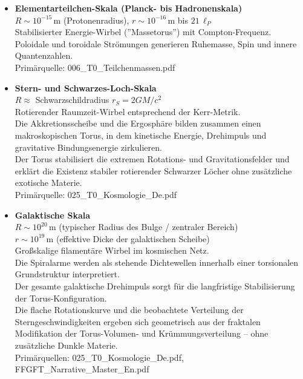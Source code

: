 \documentclass[12pt,a4paper]{article}
\begin{document}
	\begin{itemize}
		\item \textbf{Elementarteilchen-Skala (Planck- bis Hadronenskala)} \\
		$R \sim 10^{-15}\,\text{m}$ (Protonenradius), $r \sim 10^{-16}\,\text{m}$ bis $21\,\ell_P$ \\
		Stabilisierter Energie-Wirbel (''Massetorus'') mit Compton-Frequenz. \\
		Poloidale und toroidale Strömungen generieren Ruhemasse, Spin und innere Quantenzahlen. \\
		Primärquelle: 006\_T0\_Teilchenmassen.pdf
		
		\item \textbf{Stern- und Schwarzes-Loch-Skala} \\
		$R \approx$ Schwarzschildradius $r_S = 2GM/c^2$ \\
		Rotierender Raumzeit-Wirbel entsprechend der Kerr-Metrik. \\
		Die Akkretionsscheibe und die Ergosphäre bilden zusammen einen makroskopischen Torus, in dem kinetische Energie, Drehimpuls und gravitative Bindungsenergie zirkulieren. \\
		Der Torus stabilisiert die extremen Rotations- und Gravitationsfelder und erklärt die Existenz stabiler rotierender Schwarzer Löcher ohne zusätzliche exotische Materie. \\
		Primärquelle: 025\_T0\_Kosmologie\_De.pdf
		
		\item \textbf{Galaktische Skala} \\
		$R \sim 10^{20}\,\text{m}$ (typischer Radius des Bulge / zentraler Bereich) \\
		$r \sim 10^{19}\,\text{m}$ (effektive Dicke der galaktischen Scheibe) \\
		Großskalige filamentäre Wirbel im kosmischen Netz. \\
		Die Spiralarme werden als stehende Dichtewellen innerhalb einer torsionalen Grundstruktur interpretiert. \\
		Der gesamte galaktische Drehimpuls sorgt für die langfristige Stabilisierung der Torus-Konfiguration. \\
		Die flache Rotationskurve und die beobachtete Verteilung der Sterngeschwindigkeiten ergeben sich geometrisch aus der fraktalen Modifikation der Torus-Volumen- und Krümmungsverteilung – ohne zusätzliche Dunkle Materie. \\
		Primärquellen: 025\_T0\_Kosmologie\_De.pdf, FFGFT\_Narrative\_Master\_En.pdf
		

\end{itemize}
\end{document}
